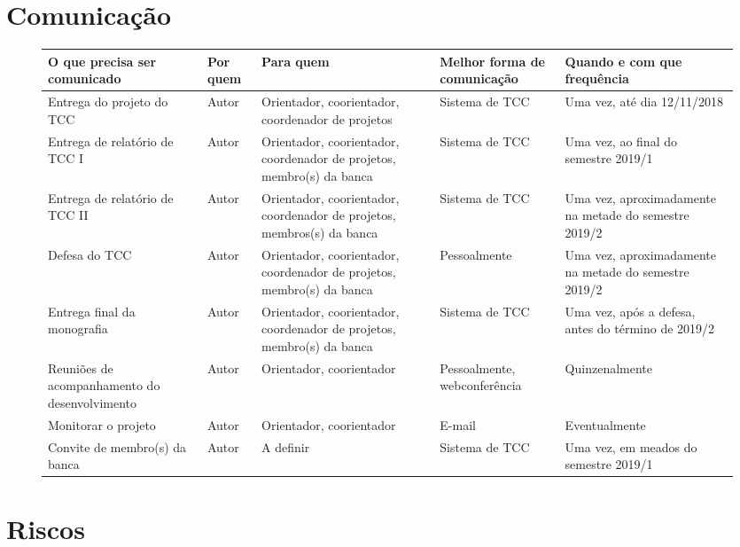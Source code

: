 \documentclass{ufsctex/ufsctex}
\begin{document}
\chapter{Comunicação}

\begin{figure}[htbp]
  \footnotesize
  \begin{tabular}{|P{1.9cm}|P{0.7cm}|P{2.5cm}|P{1.5cm}|P{2cm}|}
    \hline {}
    \textbf{O que precisa ser comunicado} & \textbf{Por quem}
      & \textbf{Para quem} & \textbf{Melhor forma de comunicação}
      & \textbf{Quando e com que frequência} \\
    \hline Entrega do projeto do TCC & Autor
      & Orientador, coorientador, coordenador de projetos & Sistema de TCC
      & Uma vez, até dia 12/11/2018 \\
    \hline Entrega de relatório de TCC I & Autor
      & Orientador, coorientador, coordenador de projetos,
      membro(s) da banca & Sistema de TCC
      & Uma vez, ao final do semestre 2019/1 \\
    \hline Entrega de relatório de TCC II & Autor
      & Orientador, coorientador, coordenador de projetos,
      membros(s) da banca & Sistema de TCC
      & Uma vez, aproximadamente na metade do semestre 2019/2 \\
    \hline Defesa do TCC & Autor
      & Orientador, coorientador, coordenador de projetos,
      membro(s) da banca & Pessoalmente
      & Uma vez, aproximadamente na metade do semestre 2019/2 \\
    \hline Entrega final da monografia & Autor
      & Orientador, coorientador, coordenador de projetos,
      membro(s) da banca & Sistema de TCC
      & Uma vez, após a defesa, antes do término de 2019/2 \\
    \hline Reuniões de acompanhamento do desenvolvimento & Autor
      & Orientador, coorientador & Pessoalmente, webconferência
      & Quinzenalmente \\
    \hline Monitorar o projeto & Autor
      & Orientador, coorientador & E-mail & Eventualmente \\
    \hline Convite de membro(s) da banca & Autor & A definir
      & Sistema de TCC & Uma vez, em meados do semestre 2019/1 \\
    \hline
  \end{tabular}
\end{figure}

\chapter{Riscos}
\end{document}
